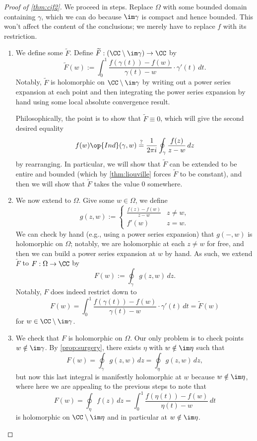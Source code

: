 \begin{proof}[Proof of \autoref{thm:cif2}]
	We proceed in steps. Replace $\Omega$ with some bounded domain containing $\gamma$, which we can do because $\im\gamma$ is compact and hence bounded. This won't affect the content of the conclusions; we merely have to replace $f$ with its restriction.
	\begin{enumerate}
		\item We define some $\widetilde F$. Define $\widetilde F:(\CC\setminus\im\gamma)\to\CC$ by
		\[\widetilde F(w):=\int_0^1\frac{f(\gamma(t))-f(w)}{\gamma(t)-w}\cdot\gamma'(t)\,dt.\]
		Notably, $\widetilde F$ is holomorphic on $\CC\setminus\im\gamma$ by writing out a power series expansion at each point and then integrating the power series expansion by hand using some local absolute convergence result.

		Philosophically, the point is to show that $\widetilde F\equiv0$, which will give the second desired equality
		\[f(w)\op{Ind}(\gamma,w)\stackrel?=\frac1{2\pi i}\oint_\gamma\frac{f(z)}{z-w}\,dz\]
		by rearranging. In particular, we will show that $\widetilde F$ can be extended to be entire and bounded (which by \autoref{thm:liouville} forces $\widetilde F$ to be constant), and then we will show that $\widetilde F$ takes the value $0$ somewhere.

		\item We now extend to $\Omega$. Give some $w\in\Omega$, we define
		\[g(z,w):=\begin{cases}
			\frac{f(z)-f(w)}{z-w} & z\ne w, \\
			f'(w) & z=w.
		\end{cases}\]
		We can check by hand (e.g., using a power series expansion) that $g(-,w)$ is holomorphic on $\Omega$; notably, we are holomorphic at each $z\ne w$ for free, and then we can build a power series expansion at $w$ by hand. As such, we extend $\widetilde F$ to $F:\Omega\to\CC$ by
		\[F(w):=\oint_\gamma g(z,w)\,dz.\]
		Notably, $F$ does indeed restrict down to
		\[F(w)=\int_0^1\frac{f(\gamma(t))-f(w)}{\gamma(t)-w}\cdot\gamma'(t)\,dt=\widetilde F(w)\]
		for $w\in\CC\setminus\im\gamma$.

		\item We check that $F$ is holomorphic on $\Omega$. Our only problem is to check points $w\notin\im\gamma$. By \autoref{prop:surgery}, there exists $\eta$ with $w\notin\im\eta$ such that
		\[F(w)=\oint_\gamma g(z,w)\,dz=\oint_\eta g(z,w)\,dz,\]
		but now this last integral is manifestly holomorphic at $w$ because $w\notin\im\eta$, where here we are appealing to the previous steps to note that
		\[F(w)=\oint_\eta f(z)\,dz=\int_0^1\frac{f(\eta(t))-f(w)}{\eta(t)-w}\,dt\]
		is holomorphic on $\CC\setminus\im\eta$ and in particular at $w\notin\im\eta$.


\end{enumerate}
\end{proof}
